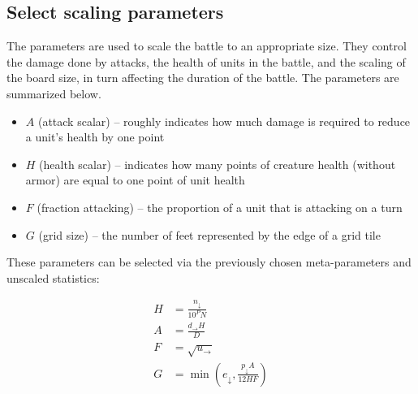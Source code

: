 \subsection{Select scaling parameters}

The parameters are used to scale the battle to an appropriate size.
They control the damage done by attacks,
the health of units in the battle,
and the scaling of the board size,
in turn affecting the duration of the battle.
The parameters are summarized below.

\begin{itemize}
    \item $A$ (attack scalar) -- roughly indicates how much damage is required to reduce a unit's health by one point
    \item $H$ (health scalar) -- indicates how many points of creature health (without armor) are equal to one point of unit health
    \item $F$ (fraction attacking) -- the proportion of a unit that is attacking on a turn
    \item $G$ (grid size) -- the number of feet represented by the edge of a grid tile
\end{itemize}

These parameters can be selected via the previously chosen meta-parameters and unscaled statistics:

\begin{align*}
    H &= \frac{n_\downarrow}{10^P N} \\
    A &= \frac{d_\rightarrow H}{D} \\
    F &= \sqrt{u_\rightarrow} \\
    G &= \min(e_\downarrow, \frac{p_\downarrow A}{12 H F})
\end{align*}

